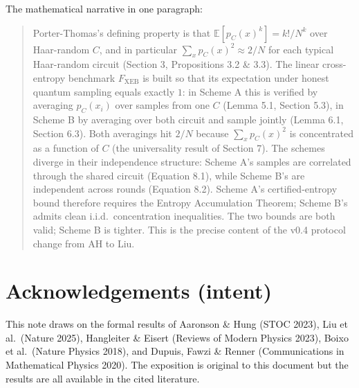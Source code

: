 \documentclass[11pt]{article}
\theoremstyle{plain}
\theoremstyle{definition}
\newcommand{\Fxeb}{F_{\text{XEB}}}
\newcommand{\E}{\mathbb{E}}
\begin{document}
The mathematical narrative in one paragraph:

\begin{quote}
Porter-Thomas's defining property is that $\E[p_C(x)^k] = k!/N^k$ over Haar-random $C$, and in particular $\sum_x p_C(x)^2 \approx 2/N$ for each typical Haar-random circuit (Section 3, Propositions 3.2 \& 3.3). The linear cross-entropy benchmark $\Fxeb$ is built so that its expectation under honest quantum sampling equals exactly $1$: in Scheme A this is verified by averaging $p_C(x_i)$ over samples from one $C$ (Lemma 5.1, Section 5.3), in Scheme B by averaging over both circuit and sample jointly (Lemma 6.1, Section 6.3). Both averagings hit $2/N$ because $\sum_x p_C(x)^2$ is concentrated as a function of $C$ (the universality result of Section 7). The schemes diverge in their independence structure: Scheme A's samples are correlated through the shared circuit (Equation 8.1), while Scheme B's are independent across rounds (Equation 8.2). Scheme A's certified-entropy bound therefore requires the Entropy Accumulation Theorem; Scheme B's admits clean i.i.d.\ concentration inequalities. The two bounds are both valid; Scheme B is tighter. This is the precise content of the v0.4 protocol change from AH to Liu.
\end{quote}

\section*{Acknowledgements (intent)}

This note draws on the formal results of Aaronson \& Hung (STOC 2023), Liu et al.\ (Nature 2025), Hangleiter \& Eisert (Reviews of Modern Physics 2023), Boixo et al.\ (Nature Physics 2018), and Dupuis, Fawzi \& Renner (Communications in Mathematical Physics 2020). The exposition is original to this document but the results are all available in the cited literature.
\end{document}
